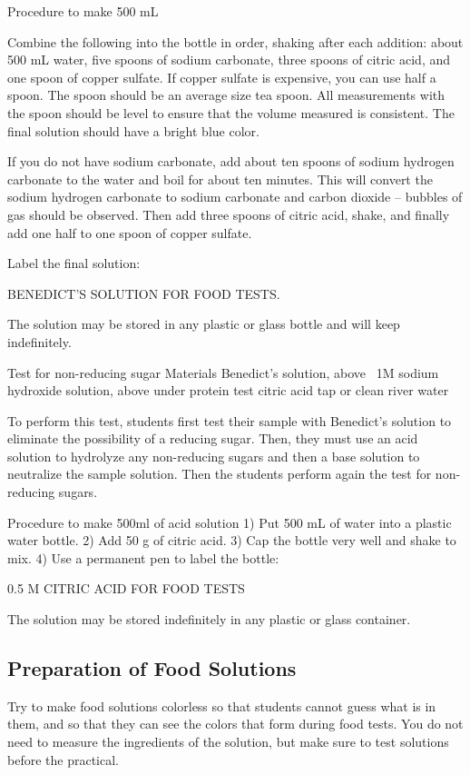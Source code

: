 \begin{enumerate}
Procedure to make 500 mL

	Combine the following into the bottle in order, shaking after each addition: about 500 mL water, five spoons of sodium carbonate, three spoons of citric acid, and one spoon of copper sulfate. If copper sulfate is expensive, you can use half a spoon. The spoon should be an average size tea spoon. All measurements with the spoon should be level to ensure that the volume measured is consistent. The final solution should have a bright blue color.

	If you do not have sodium carbonate, add about ten spoons of sodium hydrogen carbonate to the water and boil for about ten minutes. This will convert the sodium hydrogen carbonate to sodium carbonate and carbon dioxide – bubbles of gas should be observed. Then add three spoons of citric acid, shake, and finally add one half to one spoon of copper sulfate.

	Label the final solution:
	
BENEDICT'S SOLUTION FOR FOOD TESTS.

	The solution may be stored in any plastic or glass bottle and will keep indefinitely.

Test for non-reducing sugar
Materials
Benedict's solution, above
~1M sodium hydroxide solution, above under protein test
citric acid
tap or clean river water

	To perform this test, students first test their sample with Benedict's solution to eliminate the possibility of a reducing sugar. Then, they must use an acid solution to hydrolyze any non-reducing sugars and then a base solution to neutralize the sample solution. Then the students perform again the test for non-reducing sugars.

Procedure to make 500ml of acid solution
	1)	Put 500 mL of water into a plastic water bottle.
	2)	Add 50 g of citric acid.
	3)	Cap the bottle very well and shake to mix.
	4)	Use a permanent pen to label the bottle:

0.5 M CITRIC ACID FOR FOOD TESTS

	The solution may be stored indefinitely in any plastic or glass container.

\subsection{Preparation of Food Solutions}

Try to make food solutions colorless so that students cannot guess what is in them, and so that they can see the colors that form during food tests. You do not need to measure the ingredients of the solution, but make sure to test solutions before the practical.


\end{enumerate}
